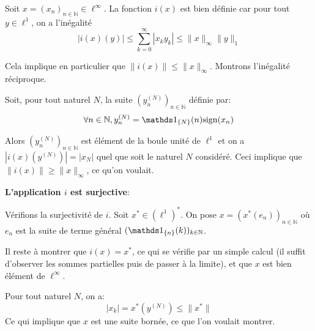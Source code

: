 Soit $x=(x_n)_{n\in\mathbb{N}}\in\ell^\infty$. La fonction $i(x)$
est bien définie car pour tout $y\in \ell^1$, on a l'inégalité
$$|i(x)(y)|\leq \sum_{k=0}^\infty |x_ky_k|\leq \|x\|_\infty \|y\|_1$$

Cela implique en particulier que $\|i(x)\|\leq\|x\|_\infty$. Montrons l'inégalité
réciproque.

Soit, pour tout naturel $N$, la suite $(y^{(N)}_n)_{n\in\mathbb{N}}$
définie par:
$$\forall n\in\mathbb{N} , y_n^{(N)}= \ind_{\{N\}}(n)\mathrm{sign}(x_n)$$

Alors $(y^{(N)}_n)_{n\in\mathbb{N}}$ est élément de la boule unité
de $\ell^1$ et on a $|i(x)(y^{(N)})| = |x_N|$ quel que soit
le naturel $N$ considéré.
Ceci implique que $\|i(x)\|\geq \|x\|_\infty$, ce qu'on voulait. \newline

\textbf{L'application $i$ est surjective}:

Vérifions la surjectivité de $i$.
Soit $x^*\in (\ell^1)^*$. On pose $x = (x^*(e_n))_{n\in\mathbb{N}}$ où $e_n$
est la suite de terme général $(\ind_{\{n\}}(k))_{k\in\mathbb{N}}$.

Il reste à montrer que $i(x) = x^*$, ce qui se vérifie par
un simple calcul (il suffit d'observer les sommes partielles
puis de passer à la limite), et que $x$ est bien élément de $\ell^\infty$.

Pour tout naturel $N$, on a:
$$|x_k| = x^*(y^{(N)})\leq \|x^*\|$$
Ce qui implique que $x$ est
une suite bornée, ce que l'on voulait montrer.